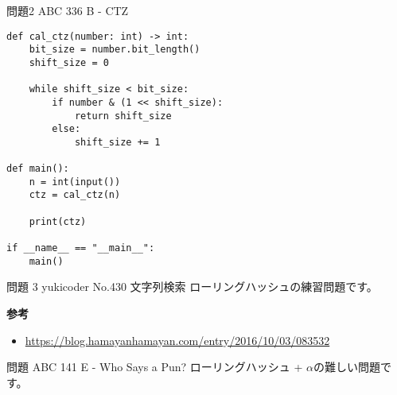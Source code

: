 \documentclass{jlreq}
\begin{document}
問題2 ABC 336 B - CTZ
\begin{lstlisting}[caption=問題2の解答, frame=TRBL, label={problem2}]
def cal_ctz(number: int) -> int:
    bit_size = number.bit_length()
    shift_size = 0
    
    while shift_size < bit_size:
        if number & (1 << shift_size):
            return shift_size
        else:
            shift_size += 1

def main():
    n = int(input())
    ctz = cal_ctz(n)
    
    print(ctz)
        
if __name__ == "__main__":
    main()
\end{lstlisting}

問題 3 yukicoder No.430 文字列検索
ローリングハッシュの練習問題です。

\textbf{参考}
\begin{itemize}
    \item \url{https://blog.hamayanhamayan.com/entry/2016/10/03/083532}
\end{itemize}

問題 ABC 141 E - Who Says a Pun?
ローリングハッシュ + $\alpha$の難しい問題です。
\end{document}
